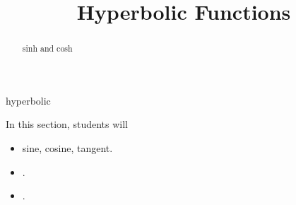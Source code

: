 \documentclass{ximera}
\title{Hyperbolic Functions}
\begin{document}
\begin{abstract}
sinh and cosh
\end{abstract}
\maketitle




hyperbolic












\begin{sectionOutcomes}
In this section, students will 

\begin{itemize}
\item sine, cosine, tangent.
\item .
\item .
\end{itemize}
\end{sectionOutcomes}
\end{document}

